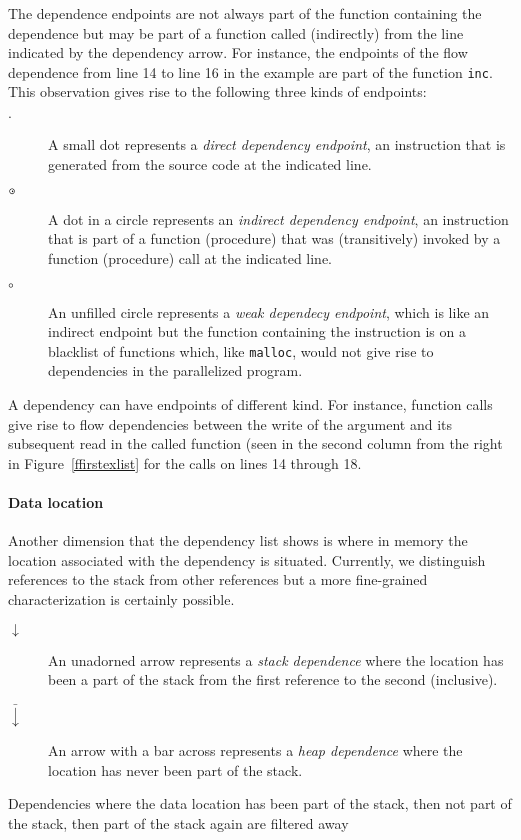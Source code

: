 The dependence endpoints are not always part of the function
containing the dependence but may be part of a function called
(indirectly) from the line indicated by the dependency arrow. For instance, the
endpoints of the flow dependence from line 14 to line 16 in the
example are part of the function {\tt inc}. This observation gives
rise to the following three kinds of endpoints:
\begin{description}
\item[$\cdot\ $] 
A small dot represents a {\em direct dependency endpoint}, an 
instruction that is
generated from the source code at the indicated line. 
\item[$\circ\hskip-0.35em\cdot\ $]
A dot in a circle represents an {\em indirect dependency endpoint},
an instruction that is part of a function (procedure) that was 
(transitively) invoked by a function (procedure) call at the indicated 
line.
\item[$\circ\ $]
An unfilled circle represents a {\em weak dependecy endpoint},
which is like an indirect endpoint but the function containing 
the instruction is on a blacklist of functions which, 
like {\tt malloc}, would not give rise to dependencies in the 
parallelized program.
\end{description}
A dependency can have endpoints of different kind. For instance,
function calls give rise to flow dependencies between the write of the
argument and its subsequent read in the called function (seen in the
second column from the right in Figure~\ref{ffirstexlist} for the
calls on lines 14 through 18.

\paragraph*{Data location}

Another dimension that the dependency list shows is where in memory
the location associated with the dependency is situated. Currently, we
distinguish references to the stack from other references but a more
fine-grained characterization is certainly possible.
\begin{description}
\item[$\downarrow\ $]
An unadorned arrow represents a
 {\em stack dependence} where the location has been a part of 
the stack from the first reference to the second (inclusive).
\item[$\bar{\downarrow}\ $]
An arrow with a bar across represents a
{\em heap dependence} where the location has never been part of the stack.
\end{description}
Dependencies where the data location has been part of the stack, then
not part of the stack, then part of the stack again are filtered away


